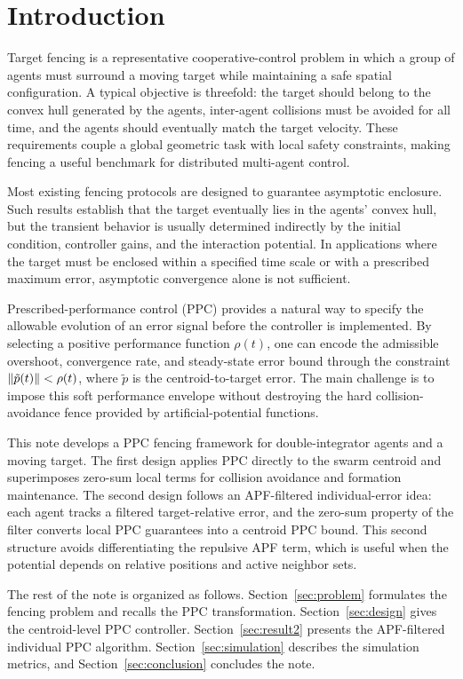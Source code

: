 \section{Introduction}
\label{sec:intro}

Target fencing is a representative cooperative-control problem in which a
group of agents must surround a moving target while maintaining a safe
spatial configuration.  A typical objective is threefold: the target should
belong to the convex hull generated by the agents, inter-agent collisions
must be avoided for all time, and the agents should eventually match the
target velocity.  These requirements couple a global geometric task with
local safety constraints, making fencing a useful benchmark for distributed
multi-agent control.

Most existing fencing protocols are designed to guarantee asymptotic
enclosure.  Such results establish that the target eventually lies in the
agents' convex hull, but the transient behavior is usually determined
indirectly by the initial condition, controller gains, and the interaction
potential.  In applications where the target must be enclosed within a
specified time scale or with a prescribed maximum error, asymptotic
convergence alone is not sufficient.

Prescribed-performance control (PPC) provides a natural way to specify the
allowable evolution of an error signal before the controller is implemented.
By selecting a positive performance function $\rho(t)$, one can encode the
admissible overshoot, convergence rate, and steady-state error bound through
the constraint $\lVert \tilde p(t) \rVert<\rho(t)$, where $\tilde p$ is the
centroid-to-target error.  The main challenge is to impose this soft
performance envelope without destroying the hard collision-avoidance fence
provided by artificial-potential functions.

This note develops a PPC fencing framework for double-integrator agents and
a moving target.  The first design applies PPC directly to the swarm centroid
and superimposes zero-sum local terms for collision avoidance and formation
maintenance.  The second design follows an APF-filtered individual-error
idea: each agent tracks a filtered target-relative error, and the zero-sum
property of the filter converts local PPC guarantees into a centroid PPC
bound.  This second structure avoids differentiating the repulsive APF term,
which is useful when the potential depends on relative positions and active
neighbor sets.

The rest of the note is organized as follows.  Section~\ref{sec:problem}
formulates the fencing problem and recalls the PPC transformation.
Section~\ref{sec:design} gives the centroid-level PPC controller.
Section~\ref{sec:result2} presents the APF-filtered individual PPC
algorithm.  Section~\ref{sec:simulation} describes the simulation metrics,
and Section~\ref{sec:conclusion} concludes the note.
